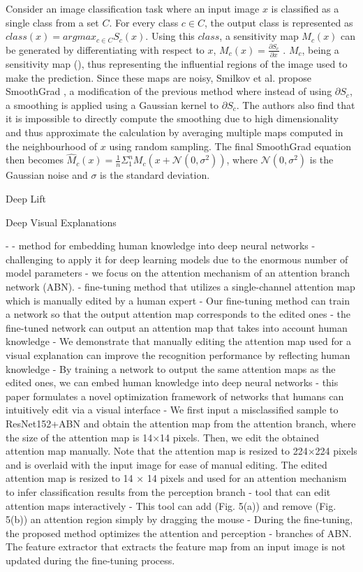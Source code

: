 Consider an image classification task where an input image $x$ is classified as a single class from a set $C$. For every class $c \in C$, the output class is represented as $class(x) = argmax_{c \in C}S_{c}(x)$. Using this $class$, a sensitivity map $M_{c}(x)$ can be generated by differentiating with respect to $x$, $M_{c}(x) = \frac{\partial S_{c}}{\partial x}$ . $M_{c}$, being a sensitivity map (\cite{simonyanDeepConvolutionalNetworks2014}), thus representing the influential regions of the image used to make the prediction. Since these maps are noisy, Smilkov et al. propose SmoothGrad \cite{smilkovSmoothGradRemovingNoise2017}, a modification of the previous method where instead of using $\partial S_{c}$, a smoothing is applied using a Gaussian kernel to $\partial S_{c}$. The authors also find that it is impossible to directly compute the smoothing due to high dimensionality and thus approximate the calculation by averaging multiple maps computed in the neighbourhood of $x$ using random sampling. The final SmoothGrad equation then becomes $\hat M_{c}(x) = \frac{1}{n}\Sigma_{1}^{n}M_{c}(x + \mathcal{N}(0, \sigma^{2}))$, where $\mathcal{N}(0, \sigma^{2})$ is the Gaussian noise and $\sigma$ is the standard deviation.

Deep Lift

Deep Visual Explanations

- \cite{mitsuharaEmbeddingHumanKnowledge2019}
- method for embedding human knowledge into deep neural networks
- challenging to apply it for deep learning models due to the enormous number of model parameters
- we focus on the attention mechanism of an attention branch network (ABN).
- fine-tuning method that utilizes a single-channel attention map which is manually edited by a human expert
- Our fine-tuning method can train a network so that the output attention map corresponds to the edited ones
- the fine-tuned network can output an attention map that takes into account human knowledge
- We demonstrate that manually editing the attention map used for a visual explanation can improve the recognition performance by reflecting human knowledge
- By training a network to output the same attention maps as the edited ones, we can embed human knowledge into deep neural networks
- this paper formulates a novel optimization framework of networks that humans can intuitively edit via a visual interface
- We first input a misclassified sample to ResNet152+ABN and obtain the attention map from the attention branch, where the size of the attention map is 14×14 pixels. Then, we edit the obtained attention map manually. Note that the attention map is resized to 224×224 pixels and is overlaid with the input image for ease of manual editing. The edited attention map is resized to 14 × 14 pixels and used for an attention mechanism to infer classification results from the perception branch
- tool that can edit attention maps interactively
- This tool can add (Fig. 5(a)) and remove (Fig. 5(b)) an attention region simply by dragging the mouse
- During the fine-tuning, the proposed method optimizes the attention and perception
- branches of ABN. The feature extractor that extracts the feature map from an input image is not updated during the fine-tuning process.

